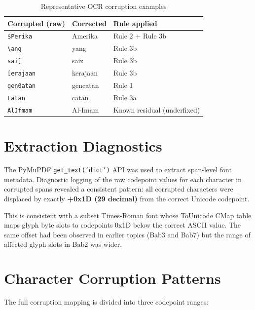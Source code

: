\documentclass[12pt, a4paper]{report}
\newcommand{\codeinline}[1]{\texttt{#1}}
\begin{document}
\begin{table}[H]
  \centering
  \caption{Representative OCR corruption examples}
  \label{tab:corruption_examples}
  \begin{tabular}{lll}
    \toprule
    \textbf{Corrupted (raw)} & \textbf{Corrected} & \textbf{Rule applied} \\
    \midrule
    \texttt{\$Perika}        & Amerika            & Rule 2 + Rule 3b \\
    \texttt{\textbackslash ang}   & yang          & Rule 3b \\
    \texttt{sai]}            & saiz               & Rule 3b \\
    \texttt{[erajaan}        & kerajaan           & Rule 3b \\
    \texttt{gen0atan}        & gencatan           & Rule 1 \\
    \texttt{Fatan}           & catan              & Rule 3a \\
    \texttt{AlJfmam}         & Al-Imam            & Known residual (underfixed) \\
    \bottomrule
  \end{tabular}
\end{table}

\section{Extraction Diagnostics}

The PyMuPDF \codeinline{get\_text('dict')} API was used to extract span-level
font metadata. Diagnostic logging of the raw codepoint values for each
character in corrupted spans revealed a consistent pattern: all corrupted
characters were displaced by exactly \textbf{+0x1D (29 decimal)} from the
correct Unicode codepoint.

This is consistent with a subset Times-Roman font whose ToUnicode CMap table
maps glyph byte slots to codepoints 0x1D below the correct ASCII value. The
same offset had been observed in earlier topics (Bab3 and Bab7) but the range
of affected glyph slots in Bab2 was wider.

\section{Character Corruption Patterns}

The full corruption mapping is divided into three codepoint ranges:
\end{document}
